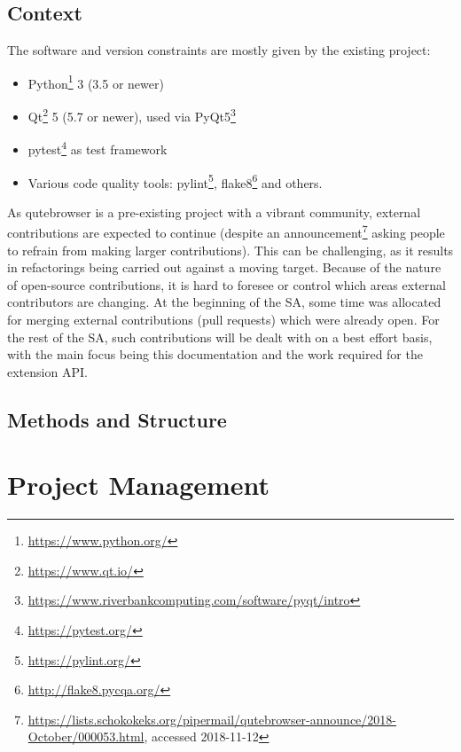 \documentclass[a4paper,parskip=full]{scrreprt}
\begin{document}
\section{Context}
\label{context}

The software and version constraints are mostly given by the existing project:

\begin{itemize}
  \item Python\footnote{\url{https://www.python.org/}} 3 (3.5 or newer)
  \item Qt\footnote{\url{https://www.qt.io/}} 5 (5.7 or newer), used via PyQt5\footnote{\url{https://www.riverbankcomputing.com/software/pyqt/intro}}
  \item pytest\footnote{\url{https://pytest.org/}} as test framework
  \item Various code quality tools: pylint\footnote{\url{https://pylint.org/}},
    flake8\footnote{\url{http://flake8.pycqa.org/}} and others.
\end{itemize}

As qutebrowser is a pre-existing project with a vibrant community, external
contributions are expected to continue (despite an
announcement\footnote{\url{https://lists.schokokeks.org/pipermail/qutebrowser-announce/2018-October/000053.html}, accessed 2018-11-12}
asking people to refrain from making larger contributions). This can be challenging,
as it results in refactorings being carried out against a moving target. Because
of the nature of open-source contributions,
it is hard to foresee or control which areas external contributors are changing.
At the beginning of the SA, some time was allocated for merging external
contributions (pull requests) which were already open. For the rest of the SA,
such contributions will be dealt with on a best effort basis, with the main
focus being this documentation and the work required for the extension API.

\section{Methods and Structure}


\chapter{Project Management}
\end{document}
